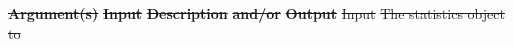 \documentclass[12pt]{report} %
\providecommand{\DIFdeltex}[1]{{\protect\color{red}\sout{#1}}}                      %
\providecommand{\DIFdelend}{} %
\providecommand{\DIFdel}[1]{\texorpdfstring{\DIFdeltex{#1}}{}} %
\DeclareRobustCommand{\DIFdelend}{\DIFOaddend \let\includegraphics\DIFOincludegraphics} %
\begin{document}
\textbf{\DIFdel{Argument(s)}} %
\textbf{\DIFdel{Input }}  %
\textbf{\DIFdel{Description}} %
\textbf{\DIFdel{and/or}}     %
\textbf{\DIFdel{Output}} %
\DIFdel{Input  }%
\DIFdel{The statistics object to }\DIFdelend %
\end{document}
